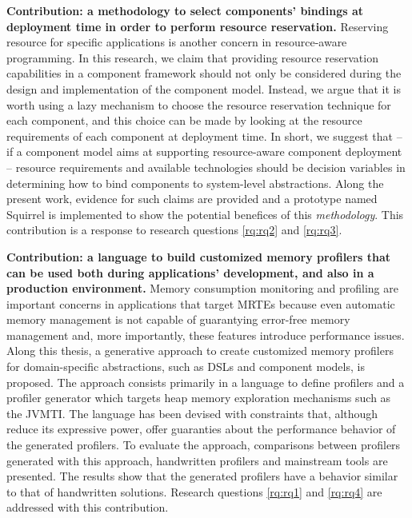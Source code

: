 \textbf{Contribution: a methodology to select components' bindings at deployment time in order to perform resource reservation.}
Reserving resource for specific applications is another concern in resource-aware programming.
In this research, we claim that providing resource reservation capabilities in a component framework should not only be considered during the design and implementation of the component model.
Instead, we argue that it is worth using a lazy mechanism to choose the resource reservation technique for each component, and this choice can be made by looking at the resource requirements of each component at deployment time.
In short, we suggest that -- if a component model aims at supporting resource-aware component deployment -- resource requirements and available technologies should be decision variables in determining how to bind components to system-level abstractions.
Along the present work, evidence for such claims are provided and a prototype named Squirrel is implemented to show the potential benefices of this \textit{methodology}.
This contribution is a response to research questions \ref{rq:rq2} and \ref{rq:rq3}.

\textbf{Contribution: a language to build customized memory profilers that can be used both during applications' development, and also in a production environment.}
Memory consumption monitoring and profiling are important concerns in applications that target MRTEs because even automatic memory management is not capable of guarantying error-free memory management and, more importantly, these features introduce performance issues.
Along this thesis, a generative approach to create customized memory profilers for domain-specific abstractions, such as DSLs and component models, is proposed.
The approach consists primarily in a language to define profilers and a profiler generator which targets heap memory exploration mechanisms such as the \gls{JVMTI}.
The language has been devised with constraints that, although reduce its expressive power, offer guaranties about the performance behavior of the generated profilers.
To evaluate the approach, comparisons between profilers generated with this approach, handwritten profilers and mainstream tools are presented.
The results show that the generated profilers have a behavior similar to that of handwritten solutions.
Research questions \ref{rq:rq1} and \ref{rq:rq4} are addressed with this contribution.
